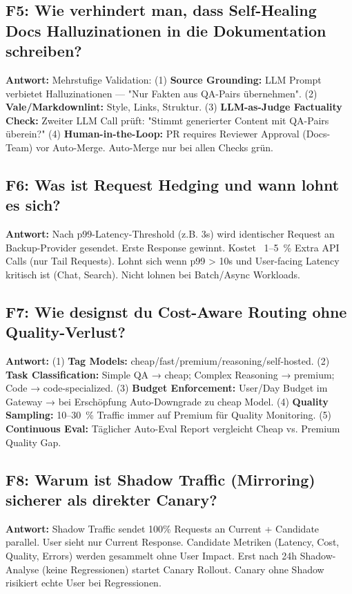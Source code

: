 \subsection*{F5: Wie verhindert man, dass Self-Healing Docs Halluzinationen in die Dokumentation schreiben?}
\textbf{Antwort:} Mehrstufige Validation: (1) \textbf{Source Grounding:} LLM Prompt verbietet Halluzinationen — "Nur Fakten aus QA-Pairs übernehmen". (2) \textbf{Vale/Markdownlint:} Style, Links, Struktur. (3) \textbf{LLM-as-Judge Factuality Check:} Zweiter LLM Call prüft: "Stimmt generierter Content mit QA-Pairs überein?" (4) \textbf{Human-in-the-Loop:} PR requires Reviewer Approval (Docs-Team) vor Auto-Merge. Auto-Merge nur bei allen Checks grün.

\subsection*{F6: Was ist Request Hedging und wann lohnt es sich?}
\textbf{Antwort:} Nach p99-Latency-Threshold (z.B. 3s) wird identischer Request an Backup-Provider gesendet. Erste Response gewinnt. Kostet ~1–5~\% Extra API Calls (nur Tail Requests). Lohnt sich wenn p99 > 10s und User-facing Latency kritisch ist (Chat, Search). Nicht lohnen bei Batch/Async Workloads.

\subsection*{F7: Wie designst du Cost-Aware Routing ohne Quality-Verlust?}
\textbf{Antwort:} (1) \textbf{Tag Models:} cheap/fast/premium/reasoning/self-hosted. (2) \textbf{Task Classification:} Simple QA → cheap; Complex Reasoning → premium; Code → code-specialized. (3) \textbf{Budget Enforcement:} User/Day Budget im Gateway → bei Erschöpfung Auto-Downgrade zu cheap Model. (4) \textbf{Quality Sampling:} 10–30~\% Traffic immer auf Premium für Quality Monitoring. (5) \textbf{Continuous Eval:} Täglicher Auto-Eval Report vergleicht Cheap vs. Premium Quality Gap.

\subsection*{F8: Warum ist Shadow Traffic (Mirroring) sicherer als direkter Canary?}
\textbf{Antwort:} Shadow Traffic sendet 100\% Requests an Current + Candidate parallel. User sieht nur Current Response. Candidate Metriken (Latency, Cost, Quality, Errors) werden gesammelt ohne User Impact. Erst nach 24h Shadow-Analyse (keine Regressionen) startet Canary Rollout. Canary ohne Shadow risikiert echte User bei Regressionen.

